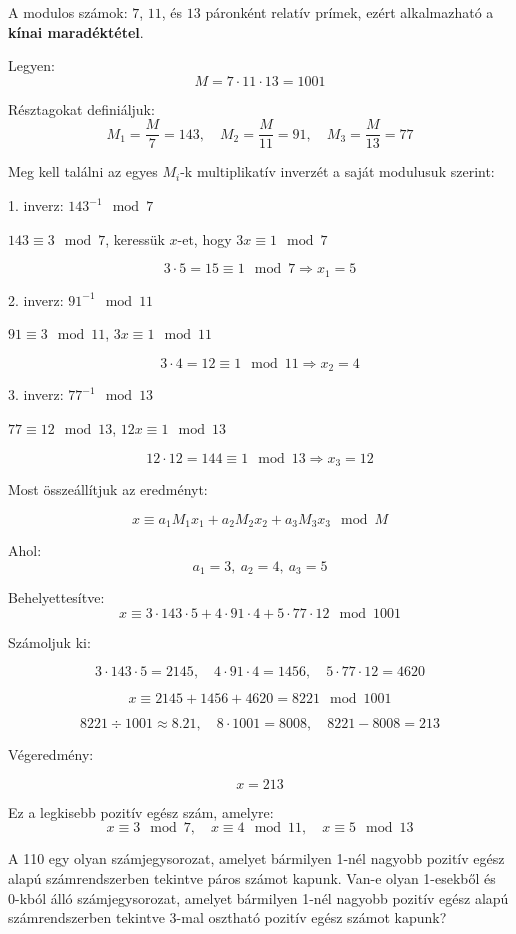 \begin{solution}
	A modulos számok: $7$, $11$, és $13$ páronként relatív prímek,
	ezért alkalmazható a \textbf{kínai maradéktétel}.
	
	Legyen: 
	\[
	M=7\cdot11\cdot13=1001
	\]
	
	Résztagokat definiáljuk: 
	\[
	M_{1}=\frac{M}{7}=143,\quad M_{2}=\frac{M}{11}=91,\quad M_{3}=\frac{M}{13}=77
	\]
	
	Meg kell találni az egyes $M_{i}$-k multiplikatív inverzét a saját
	modulusuk szerint:
	
	1. inverz: $143^{-1}\mod 7$
	
	$143\equiv3\mod 7$, keressük $x$-et, hogy $3x\equiv1\mod 7$
	
	\[
	3\cdot5=15\equiv1\mod 7\Rightarrow x_{1}=5
	\]
	
	2. inverz: $91^{-1}\mod 11$
	
	$91\equiv3\mod 11$, $3x\equiv1\mod 11$
	
	\[
	3\cdot4=12\equiv1\mod 11\Rightarrow x_{2}=4
	\]
	
	3. inverz: $77^{-1}\mod 13$
	
	$77\equiv12\mod 13$, $12x\equiv1\mod 13$
	
	\[
	12\cdot12=144\equiv1\mod 13\Rightarrow x_{3}=12
	\]
	
	Most összeállítjuk az eredményt:
	
	\[
	x\equiv a_{1}M_{1}x_{1}+a_{2}M_{2}x_{2}+a_{3}M_{3}x_{3}\mod M
	\]
	
	Ahol: 
	\[
	a_{1}=3,\ a_{2}=4,\ a_{3}=5
	\]
	
	Behelyettesítve: 
	\[
	x\equiv3\cdot143\cdot5+4\cdot91\cdot4+5\cdot77\cdot12\mod 1001
	\]
	
	Számoljuk ki:
	
	\[
	3\cdot143\cdot5=2145,\quad4\cdot91\cdot4=1456,\quad5\cdot77\cdot12=4620
	\]
	
	\[
	x\equiv2145+1456+4620=8221\mod 1001
	\]
	
	\[
	8221\div1001\approx8.21,\quad8\cdot1001=8008,\quad8221-8008=213
	\]
	
	Végeredmény:
	
	\[
	\boxed{x=213}
	\]
	
	Ez a legkisebb pozitív egész szám, amelyre: 
	\[
	x\equiv3\mod 7,\quad x\equiv4\mod 11,\quad x\equiv5\mod 13
	\]
\end{solution}
\begin{extraproblem}
	A 110 egy olyan számjegysorozat, amelyet bármilyen 1-nél nagyobb
	pozitív egész alapú számrendszerben tekintve páros számot kapunk.
	Van-e olyan 1-esekből és 0-kból álló számjegysorozat, amelyet bármilyen
	1-nél nagyobb pozitív egész alapú számrendszerben tekintve 3-mal osztható
	pozitív egész számot kapunk?
\end{extraproblem}

